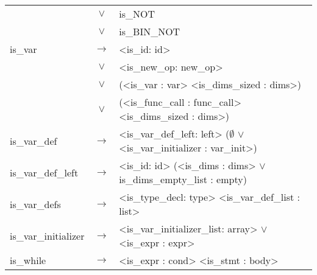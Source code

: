 \documentclass[a4paper]{article}
\begin{document}
\begin{longtable}{lcl}
								& $\vee$ & is\_NOT \\
								& $\vee$ & is\_BIN\_NOT \\
	is\_var					 	& $\to$ & <is\_id: id> \\
								& $\vee$ & <is\_new\_op: new\_op> \\
								& $\vee$ & (<is\_var : var> <is\_dims\_sized : dims>) \\
								& $\vee$ & (<is\_func\_call : func\_call> <is\_dims\_sized : dims>) \\
	is\_var\_def			 	& $\to$ & <is\_var\_def\_left: left> ($\emptyset$ $\vee$ <is\_var\_initializer : var\_init>) \\
	is\_var\_def\_left		 	& $\to$ & <is\_id: id> (<is\_dims : dims> $\vee$ is\_dims\_empty\_list : empty) \\
	is\_var\_defs		 		& $\to$ & <is\_type\_decl: type> <is\_var\_def\_list : list> \\
	is\_var\_initializer 		& $\to$ & <is\_var\_initializer\_list: array> $\vee$ <is\_expr : expr> \\
	is\_while 					& $\to$ & <is\_expr : cond> <is\_stmt : body> \\
\end{longtable}
\end{document}
